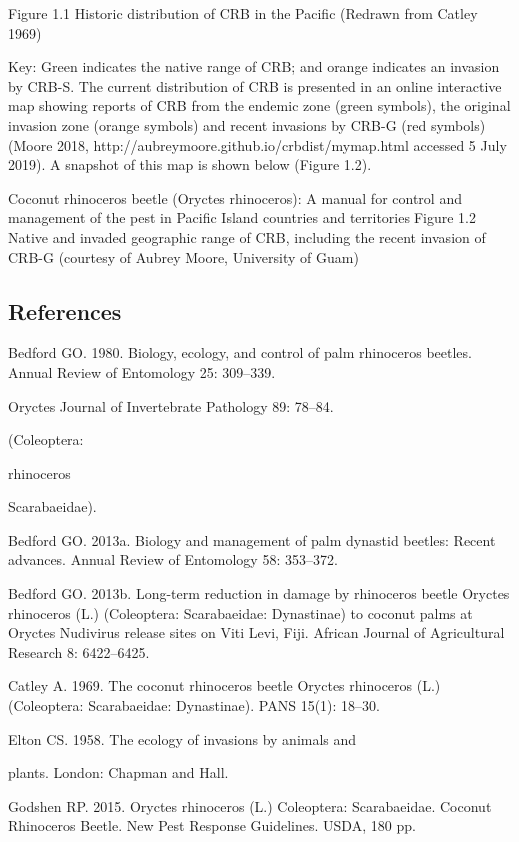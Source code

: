 \documentclass[twocolumn,letterpaper]{scrartcl}
\begin{document}
Figure 1.1 Historic distribution of CRB in the Pacific (Redrawn from Catley 1969) 

Key: Green indicates the native range of CRB; and orange indicates an invasion by CRB-S.
The current distribution of CRB is presented in an online interactive map showing reports of CRB from the endemic zone 
(green symbols), the original invasion zone (orange symbols) and recent invasions by CRB-G (red symbols) (Moore 2018, 
http://aubreymoore.github.io/crbdist/mymap.html accessed 5 July 2019). A snapshot of this map is shown below (Figure 1.2). 

Coconut rhinoceros beetle (Oryctes rhinoceros): A manual for control and management of the pest in Pacific Island countries and territoriesFigure 1.2  Native and invaded geographic range of CRB, including the recent invasion of CRB-G (courtesy of 
Aubrey Moore, University of Guam)

\subsection{References}

Bedford GO. 1980. Biology, ecology, and control of palm 
rhinoceros  beetles.  Annual  Review  of  Entomology 
25: 309–339.

Oryctes 
Journal of Invertebrate Pathology 89: 78–84.

(Coleoptera: 

rhinoceros 

Scarabaeidae). 

Bedford GO. 2013a. Biology and management of palm 
dynastid beetles: Recent advances. Annual Review of 
Entomology 58: 353–372.

Bedford GO. 2013b. Long-term reduction in damage by 
rhinoceros beetle Oryctes rhinoceros (L.) (Coleoptera: 
Scarabaeidae:  Dynastinae)  to  coconut  palms  at 
Oryctes Nudivirus release sites on Viti Levi, Fiji. African 
Journal of Agricultural Research 8: 6422–6425.

Catley  A.  1969.  The  coconut  rhinoceros  beetle Oryctes 
rhinoceros (L.) (Coleoptera: Scarabaeidae: Dynastinae). 
PANS 15(1): 18–30.

Elton CS. 1958. The ecology of invasions by animals and 

plants. London: Chapman and Hall.

Godshen  RP.  2015.  Oryctes  rhinoceros  (L.)  Coleoptera: 
Scarabaeidae. Coconut Rhinoceros Beetle. New Pest 
Response Guidelines. USDA, 180 pp.
\end{document}
